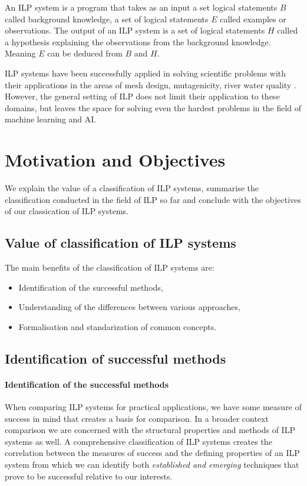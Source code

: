 An ILP system is a program that takes as an input a set logical statements $B$ called background knowledge, a set of logical statements $E$ called examples or observations. The output of an ILP system is a set of logical statements $H$ called a hypothesis explaining the observations from the background knowledge. Meaning $E$ can be deduced from $B$ and $H$.

ILP systems have been successfully applied in solving scientific problems with their applications in the areas of mesh design, mutagenicity, river water quality 
\cite{bratko1995applications}. However, the general setting of ILP does not limit their application to these domains, but leaves the space for solving even the hardest problems in the field of machine learning and AI.
\section{Motivation and Objectives}
We explain the value of a classification of ILP systems, summarise the classification conducted in the field of ILP so far and conclude with the objectives of our classication of ILP systems.

\subsection{Value of classification of ILP systems}
The main benefits of the classification of ILP systems are:
\begin{itemize}
\item Identification of the successful methods,
\item Understanding of the differences between various approaches,
\item Formalisation and standarization of common concepts.
\end{itemize}

\subsection{Identification of successful methods}
\paragraph{Identification of the successful methods}
When comparing ILP systems for practical applications, we have some measure of success in mind that creates a basis for comparison. In a broader context comparison we are concerned with the structural properties and methods of ILP systems as well.
A comprehensive classification of ILP systems creates the correlation between the measures of success and the defining properties of an ILP system from which we can identify both \emph{established and emerging} techniques that prove to be successful relative to our interests.
